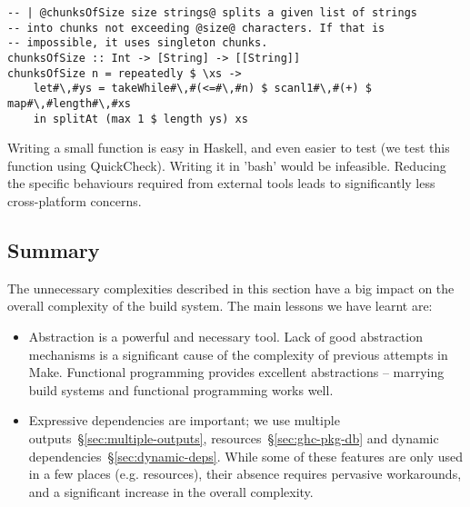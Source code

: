 \begin{lstlisting}
-- | @chunksOfSize size strings@ splits a given list of strings
-- into chunks not exceeding @size@ characters. If that is
-- impossible, it uses singleton chunks.
chunksOfSize :: Int -> [String] -> [[String]]
chunksOfSize n = repeatedly $ \xs ->
    let#\,#ys = takeWhile#\,#(<=#\,#n) $ scanl1#\,#(+) $ map#\,#length#\,#xs
    in splitAt (max 1 $ length ys) xs
\end{lstlisting}

\noindent Writing a small function is easy in Haskell, and even easier to test
(we test this function using QuickCheck). Writing it in \lst'bash' would be infeasible.
Reducing the specific behaviours required from external tools leads to
significantly less cross-platform concerns.

\subsection{Summary}

The unnecessary complexities described in this section have a big impact on
the overall complexity of the build system. The main lessons we have learnt are:

\begin{itemize}
\item Abstraction is a powerful and necessary tool. Lack of good abstraction
mechanisms is a significant cause of the complexity of previous attempts in
Make. Functional programming provides excellent abstractions --
marrying build systems and functional programming works well.
\item Expressive dependencies are important; we use
multiple outputs~\S\ref{sec:multiple-outputs},
resources~\S\ref{sec:ghc-pkg-db} and dynamic dependencies~\S\ref{sec:dynamic-deps}.
While some of these
features are only used in a few places (e.g. resources), their absence
requires pervasive workarounds, and a significant increase in the overall complexity.
\end{itemize}

%
%
%
%
